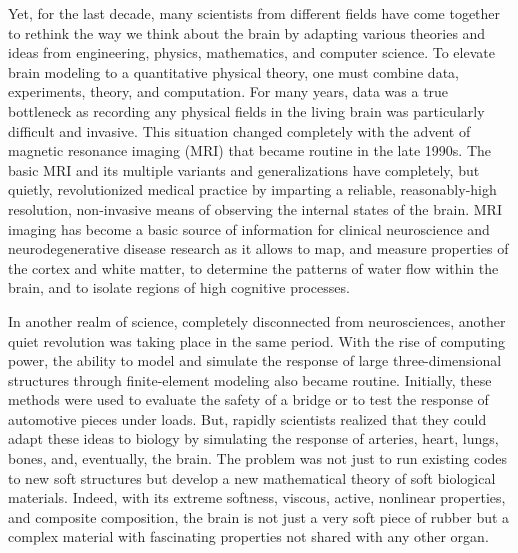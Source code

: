 Yet, for the last decade, many scientists from different fields have
come together to rethink the way we think about the brain by adapting
various theories and ideas from engineering, physics, mathematics, and
computer science. To elevate brain modeling to a quantitative physical
theory, one must combine data, experiments, theory, and
computation. For many years, data was a true bottleneck as recording
any physical fields in the living brain was particularly difficult and
invasive. This situation changed completely with the advent of
magnetic resonance imaging (MRI) that became routine in the late
1990s. The basic MRI and its multiple variants and generalizations
have completely, but quietly, revolutionized medical practice by
imparting a reliable, reasonably-high resolution, non-invasive means
of observing the internal states of the brain.  MRI imaging has become
a basic source of information for clinical neuroscience and
neurodegenerative disease research as it allows to map, and measure
properties of the cortex and white matter, to determine the patterns
of water flow within the brain, and to isolate regions of high
cognitive processes.

In another realm of science, completely disconnected from
neurosciences, another quiet revolution was taking place in the same
period. With the rise of computing power, the ability to model and
simulate the response of large three-dimensional structures through
finite-element modeling also became routine. Initially, these methods
were used to evaluate the safety of a bridge or to test the response
of automotive pieces under loads. But, rapidly scientists realized
that they could adapt these ideas to biology by simulating the
response of arteries, heart, lungs, bones, and, eventually, the
brain. The problem was not just to run existing codes to new soft
structures but develop a new mathematical theory of soft biological
materials.  Indeed, with its extreme softness, viscous, active,
nonlinear properties, and composite composition, the brain is not just
a very soft piece of rubber but a complex material with fascinating
properties not shared with any other organ.

